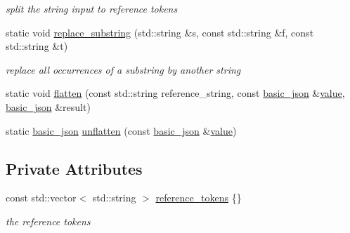 \begin{DoxyCompactItemize}
\begin{DoxyCompactList}\small\item\em split the string input to reference tokens \end{DoxyCompactList}\item 
static void \hyperlink{classnlohmann_1_1basic__json_1_1json__pointer_a414bce1ecc972c4f036f6edd021c70cf_a414bce1ecc972c4f036f6edd021c70cf}{replace\-\_\-substring} (std\-::string \&s, const std\-::string \&f, const std\-::string \&t)
\begin{DoxyCompactList}\small\item\em replace all occurrences of a substring by another string \end{DoxyCompactList}\item 
static void \hyperlink{classnlohmann_1_1basic__json_1_1json__pointer_af9b39e7f59529e9496a2b84d07ae1e17_af9b39e7f59529e9496a2b84d07ae1e17}{flatten} (const std\-::string reference\-\_\-string, const \hyperlink{classnlohmann_1_1basic__json}{basic\-\_\-json} \&\hyperlink{classnlohmann_1_1basic__json_a0a2cbbd95862a623e7dc5c37e67dead0_a0a2cbbd95862a623e7dc5c37e67dead0}{value}, \hyperlink{classnlohmann_1_1basic__json}{basic\-\_\-json} \&result)
\item 
static \hyperlink{classnlohmann_1_1basic__json}{basic\-\_\-json} \hyperlink{classnlohmann_1_1basic__json_1_1json__pointer_a16cb91da82183ec5e87d90b4599591b2_a16cb91da82183ec5e87d90b4599591b2}{unflatten} (const \hyperlink{classnlohmann_1_1basic__json}{basic\-\_\-json} \&\hyperlink{classnlohmann_1_1basic__json_a0a2cbbd95862a623e7dc5c37e67dead0_a0a2cbbd95862a623e7dc5c37e67dead0}{value})
\end{DoxyCompactItemize}
\subsection*{Private Attributes}
\begin{DoxyCompactItemize}
\item 
\hypertarget{classnlohmann_1_1basic__json_1_1json__pointer_ac0888a103114824679dbbbcf2a3a1a13_ac0888a103114824679dbbbcf2a3a1a13}{const std\-::vector$<$ std\-::string $>$ \hyperlink{classnlohmann_1_1basic__json_1_1json__pointer_ac0888a103114824679dbbbcf2a3a1a13_ac0888a103114824679dbbbcf2a3a1a13}{reference\-\_\-tokens} \{\}}\label{classnlohmann_1_1basic__json_1_1json__pointer_ac0888a103114824679dbbbcf2a3a1a13_ac0888a103114824679dbbbcf2a3a1a13}

\begin{DoxyCompactList}\small\item\em the reference tokens \end{DoxyCompactList}\end{DoxyCompactItemize}
